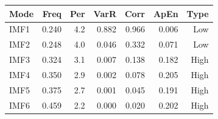 {\tiny\setlength{\tabcolsep}{1pt}\begin{tabular}{lrrrrrr} \toprule
Mode & Freq & Per & VarR & Corr & ApEn & Type \\ \midrule
IMF1 & 0.240 & 4.2 & 0.882 & 0.966 & 0.006 & Low \\ 
IMF2 & 0.248 & 4.0 & 0.046 & 0.332 & 0.071 & Low \\ 
IMF3 & 0.324 & 3.1 & 0.007 & 0.138 & 0.182 & High \\ 
IMF4 & 0.350 & 2.9 & 0.002 & 0.078 & 0.205 & High \\ 
IMF5 & 0.375 & 2.7 & 0.001 & 0.045 & 0.191 & High \\ 
IMF6 & 0.459 & 2.2 & 0.000 & 0.020 & 0.202 & High \\ 
\bottomrule \end{tabular}}